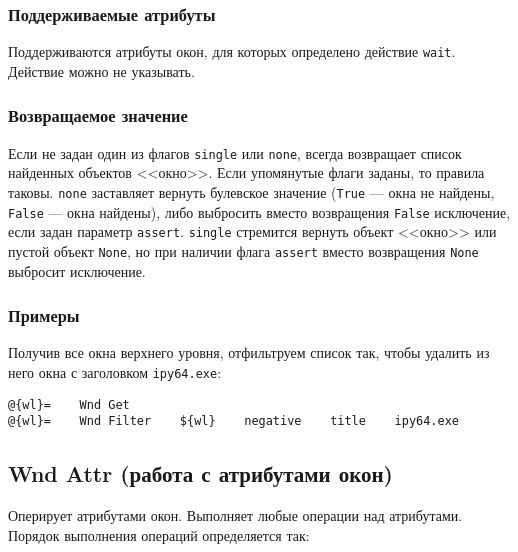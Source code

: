 \documentclass[11pt]{book} %
\begin{document}
\subsubsection*{Поддерживаемые атрибуты} 

Поддерживаются атрибуты окон, для которых определено действие \verb|wait|. Действие можно не указывать.


\subsubsection*{Возвращаемое значение}
Если не задан один из флагов \verb"single" или \verb"none", всегда возвращает список найденных объектов <<окно>>. Если упомянутые флаги заданы, то правила таковы. \verb"none" заставляет вернуть булевское значение (\verb"True" --- окна не найдены, \verb"False" --- окна найдены), либо выбросить вместо возвращения \verb"False" исключение, если задан параметр \verb"assert". \verb"single" стремится вернуть объект <<окно>> или пустой объект \verb"None", но при наличии флага \verb"assert" вместо возвращения \verb"None" выбросит исключение.



\subsubsection*{Примеры}
Получив все окна верхнего уровня, отфильтруем список так, чтобы удалить из него окна с заголовком \verb"ipy64.exe":

\begin{verbatim}
@{wl}=    Wnd Get
@{wl}=    Wnd Filter    ${wl}    negative    title    ipy64.exe
\end{verbatim}


\subsection{Wnd Attr (работа с атрибутами окон)}
Оперирует атрибутами окон. Выполняет любые операции над атрибутами. Порядок выполнения операций определяется так:
\end{document}
